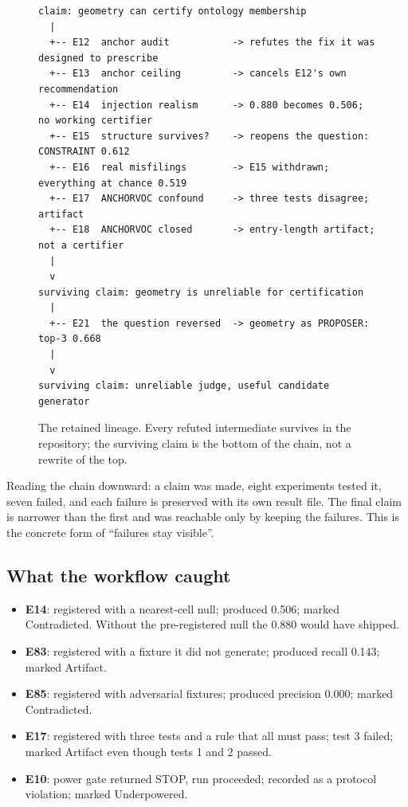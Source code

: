 \documentclass[11pt]{article}
\begin{document}
\begin{figure}[h]
\centering
\begin{verbatim}
claim: geometry can certify ontology membership
  |
  +-- E12  anchor audit           -> refutes the fix it was designed to prescribe
  +-- E13  anchor ceiling         -> cancels E12's own recommendation
  +-- E14  injection realism      -> 0.880 becomes 0.506; no working certifier
  +-- E15  structure survives?    -> reopens the question: CONSTRAINT 0.612
  +-- E16  real misfilings        -> E15 withdrawn; everything at chance 0.519
  +-- E17  ANCHORVOC confound     -> three tests disagree; artifact
  +-- E18  ANCHORVOC closed       -> entry-length artifact; not a certifier
  |
  v
surviving claim: geometry is unreliable for certification
  |
  +-- E21  the question reversed  -> geometry as PROPOSER: top-3 0.668
  |
  v
surviving claim: unreliable judge, useful candidate generator
\end{verbatim}
\caption{The retained lineage. Every refuted intermediate survives in the
repository; the surviving claim is the bottom of the chain, not a rewrite
of the top.}
\label{fig:lineage}
\end{figure}

Reading the chain downward: a claim was made, eight experiments tested it,
seven failed, and each failure is preserved with its own result file. The
final claim is narrower than the first and was reachable only by keeping
the failures. This is the concrete form of ``failures stay visible''.

\subsection{What the workflow caught}

\begin{itemize}
\item \textbf{E14}: registered with a nearest-cell null; produced 0.506;
  marked Contradicted. Without the pre-registered null the 0.880 would have
  shipped.
\item \textbf{E83}: registered with a fixture it did not generate; produced
  recall 0.143; marked Artifact.
\item \textbf{E85}: registered with adversarial fixtures; produced precision
  0.000; marked Contradicted.
\item \textbf{E17}: registered with three tests and a rule that all must
  pass; test 3 failed; marked Artifact even though tests 1 and 2 passed.
\item \textbf{E10}: power gate returned STOP, run proceeded; recorded as a
  protocol violation; marked Underpowered.
\end{itemize}
\end{document}
